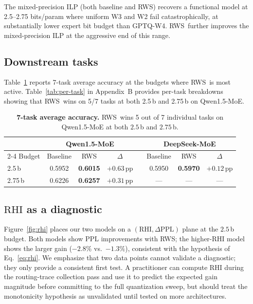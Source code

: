 \documentclass{article}
\newcommand{\method}{\textsc{RWS}\xspace}
\newcommand{\rhi}{\mathrm{RHI}}
\begin{document}
The mixed-precision ILP (both baseline and \method) recovers a functional model at 2.5--2.75 bits/param where uniform W3 and W2 fail catastrophically, at substantially lower expert bit budget than GPTQ-W4. \method\ further improves the mixed-precision ILP at the aggressive end of this range.

\subsection{Downstream tasks}

Table~\ref{tab:downstream} reports 7-task average accuracy at the budgets where \method\ is most active. Table~\ref{tab:per-task} in Appendix~B provides per-task breakdowns showing that \method\ wins on 5/7 tasks at both 2.5\,b and 2.75\,b on Qwen1.5-MoE.

\begin{table}[ht]
\centering
\small
\caption{\textbf{7-task average accuracy.} \method\ wins 5 out of 7 individual tasks on Qwen1.5-MoE at both $2.5$\,b and $2.75$\,b.}
\label{tab:downstream}
\begin{tabular}{lccccccc}
\toprule
 & \multicolumn{3}{c}{Qwen1.5-MoE} & & \multicolumn{3}{c}{DeepSeek-MoE} \\
\cmidrule{2-4}\cmidrule{6-8}
Budget & Baseline & \method & $\Delta$ & & Baseline & \method & $\Delta$ \\
\midrule
2.5\,b  & 0.5952 & \textbf{0.6015} & $+0.63$\,pp & & 0.5950 & \textbf{0.5970} & $+0.12$\,pp \\
2.75\,b & 0.6226 & \textbf{0.6257} & $+0.31$\,pp & & --- & --- & --- \\
\bottomrule
\end{tabular}
\end{table}

\subsection{$\rhi$ as a diagnostic}
\label{sec:rhi-validation}

Figure~\ref{fig:rhi} places our two models on a $(\rhi, \Delta\text{PPL})$ plane at the $2.5$\,b budget. Both models show PPL improvements with \method; the higher-$\rhi$ model shows the larger gain ($-2.8\%$ vs.\ $-1.3\%$), consistent with the hypothesis of Eq.~\ref{eq:rhi}. We emphasize that two data points cannot validate a diagnostic; they only provide a consistent first test. A practitioner can compute $\rhi$ during the routing-trace collection pass and use it to predict the expected gain magnitude before committing to the full quantization sweep, but should treat the monotonicity hypothesis as unvalidated until tested on more architectures.
\end{document}
